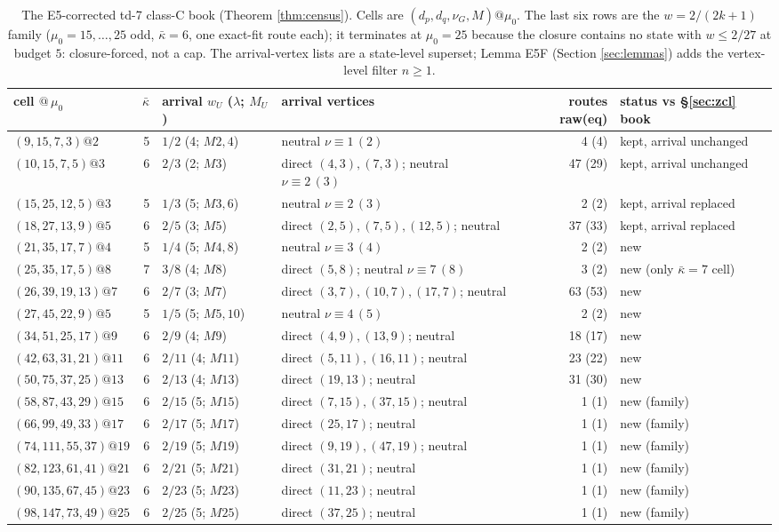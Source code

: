 \documentclass[11pt]{article}
\theoremstyle{definition}
\theoremstyle{remark}
\newcommand{\kb}{\bar\kappa}
\begin{document}
\begin{table}[ht]
\centering\scriptsize\setlength{\tabcolsep}{2.5pt}
\begin{tabular}{lrllrl}
\toprule
cell $@\,\mu_0$ & $\kb$ & arrival $w_U$ ($\lambda$; $M_U$) & arrival vertices & routes raw(eq) & status vs \S\ref{sec:zcl} book\\
\midrule
$(9,15,7,3)@2$ & 5 & $1/2$ (4; $M2,4$) & neutral $\nu\equiv1\,(2)$ & 4 (4) & kept, arrival unchanged\\
$(10,15,7,5)@3$ & 6 & $2/3$ (2; $M3$) & direct $(4,3),(7,3)$; neutral $\nu\equiv2\,(3)$ & 47 (29) & kept, arrival unchanged\\
$(15,25,12,5)@3$ & 5 & $1/3$ (5; $M3,6$) & neutral $\nu\equiv2\,(3)$ & 2 (2) & kept, arrival replaced\\
$(18,27,13,9)@5$ & 6 & $2/5$ (3; $M5$) & direct $(2,5),(7,5),(12,5)$; neutral & 37 (33) & kept, arrival replaced\\
$(21,35,17,7)@4$ & 5 & $1/4$ (5; $M4,8$) & neutral $\nu\equiv3\,(4)$ & 2 (2) & new\\
$(25,35,17,5)@8$ & 7 & $3/8$ (4; $M8$) & direct $(5,8)$; neutral $\nu\equiv7\,(8)$ & 3 (2) & new (only $\kb=7$ cell)\\
$(26,39,19,13)@7$ & 6 & $2/7$ (3; $M7$) & direct $(3,7),(10,7),(17,7)$; neutral & 63 (53) & new\\
$(27,45,22,9)@5$ & 5 & $1/5$ (5; $M5,10$) & neutral $\nu\equiv4\,(5)$ & 2 (2) & new\\
$(34,51,25,17)@9$ & 6 & $2/9$ (4; $M9$) & direct $(4,9),(13,9)$; neutral & 18 (17) & new\\
$(42,63,31,21)@11$ & 6 & $2/11$ (4; $M11$) & direct $(5,11),(16,11)$; neutral & 23 (22) & new\\
$(50,75,37,25)@13$ & 6 & $2/13$ (4; $M13$) & direct $(19,13)$; neutral & 31 (30) & new\\
$(58,87,43,29)@15$ & 6 & $2/15$ (5; $M15$) & direct $(7,15),(37,15)$; neutral & 1 (1) & new (family)\\
$(66,99,49,33)@17$ & 6 & $2/17$ (5; $M17$) & direct $(25,17)$; neutral & 1 (1) & new (family)\\
$(74,111,55,37)@19$ & 6 & $2/19$ (5; $M19$) & direct $(9,19),(47,19)$; neutral & 1 (1) & new (family)\\
$(82,123,61,41)@21$ & 6 & $2/21$ (5; $M21$) & direct $(31,21)$; neutral & 1 (1) & new (family)\\
$(90,135,67,45)@23$ & 6 & $2/23$ (5; $M23$) & direct $(11,23)$; neutral & 1 (1) & new (family)\\
$(98,147,73,49)@25$ & 6 & $2/25$ (5; $M25$) & direct $(37,25)$; neutral & 1 (1) & new (family)\\
\bottomrule
\end{tabular}
\caption{The E5-corrected td-7 class-C book (Theorem \ref{thm:census}). Cells are $(d_p,d_q,\nu_G,M)@\mu_0$. The last six rows are the $w=2/(2k+1)$ family ($\mu_0=15,\dots,25$ odd, $\kb=6$, one exact-fit route each); it terminates at $\mu_0=25$ because the closure contains no state with $w\leq2/27$ at budget $5$: closure-forced, not a cap. The arrival-vertex lists are a state-level superset; Lemma E5F (Section \ref{sec:lemmas}) adds the vertex-level filter $n\geq1$.}
\label{tab:census}
\end{table}
\end{document}
